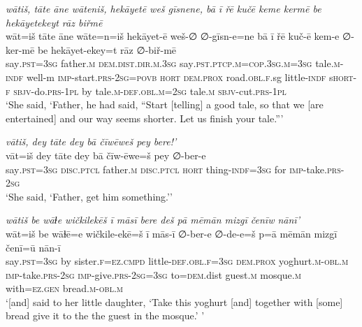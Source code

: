 \ea \label{ŽH.27}
\textit{wātiš, tāte āne wāteniš, hekāyetē weš gīsnene, bā ī řē kučē keme kermē be hekāyetekeyt rāz biřmē} \\ 
\gll wāt=iš tāte āne wāte=n=iš hekāyet-ē weš-∅ ∅-gīsn-e=ne bā ī řē kuč-ē kem-e ∅-ker-mē be hekāyet-ekey=t rāz ∅-biř-mē \\ 
 say\textsc{.pst}\textsc{=3sg} father\textsc{.m} \textsc{dem.dist}\textsc{.dir}\textsc{.m}\textsc{.3sg} say\textsc{.pst}\textsc{.ptcp}\textsc{.m}\textsc{=cop}\textsc{.3sg}\textsc{.m}\textsc{=3sg} tale\textsc{.m}\textsc{-indf} well-m \textsc{imp-}start\textsc{.prs}-\textsc{2sg}\textsc{=\textsc{povb}} \textsc{hort} \textsc{dem.prox} road\textsc{.obl}\textsc{\textsc{.f}}.sg little\textsc{-indf} s\textsc{hort}\textsc{-f} \textsc{sbjv-}do\textsc{.prs}\textsc{-1pl} by tale\textsc{.m}\textsc{-def}\textsc{.obl}\textsc{.m}\textsc{=\textsc{2sg}} tale\textsc{.m} \textsc{sbjv-}cut\textsc{.prs}\textsc{-1pl} \\ 
\glt `She said, ‘Father, he had said, “Start [telling] a good tale, so that we [are entertained] and our way seems shorter. Let us finish your tale.”'
\z 
 
\ea \label{ŽH.38}
\textit{vātiš, dey tāte dey bā čīwēweš pey bere!’} \\ 
\gll vāt=iš dey tāte dey bā čīw-ēwe=š pey ∅-ber-e \\ 
 say\textsc{.pst}\textsc{=3sg} \textsc{disc.ptcl} father\textsc{.m} \textsc{disc.ptcl} \textsc{hort} thing\textsc{-indf}\textsc{=3sg} for \textsc{imp-}take\textsc{.prs}-\textsc{2sg} \\ 
\glt `She said, ‘Father, get him something.’'
\z 
 
\ea \label{ŽH.40}
\textit{wātiš be wāɫe wičkilekēš ī māsī bere deš pā mēmān mizgī čenīw nānī’} \\ 
\gll wāt=iš be wāɫē=e wičkile-ekē=š ī mās-ī ∅-ber-e ∅-de-e=š p=ā mēmān mizgī čenī=ū nān-ī \\ 
 say\textsc{.pst}\textsc{=3sg} by sister\textsc{\textsc{.f}}\textsc{=ez}\textsc{.cmpd} little\textsc{-def}\textsc{.obl}\textsc{\textsc{.f}}\textsc{=3sg} \textsc{dem.prox} yoghurt\textsc{.m}\textsc{-obl}\textsc{.m} \textsc{imp-}take\textsc{.prs}-\textsc{2sg} \textsc{imp-}give\textsc{.prs}-\textsc{2sg}\textsc{=3sg} to\textsc{=dem}.dist guest\textsc{.m} mosque\textsc{.m} with\textsc{=ez}\textsc{.gen} bread\textsc{.m}\textsc{-obl}\textsc{.m} \\ 
\glt `[and] said to her little daughter, ‘Take this yoghurt [and] together with [some] bread give it to the the guest in the mosque.’ '
\z 
 
